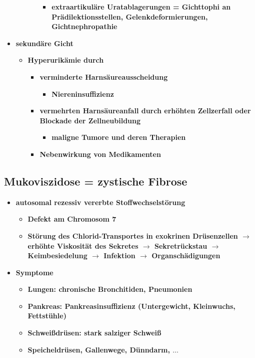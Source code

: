 \begin{itemize}
\begin{itemize}
\begin{itemize}
							\begin{itemize}
								\item \textbf{extraartikuläre Uratablagerungen = Gichttophi an Prädilektionsstellen, Gelenkdeformierungen, Gichtnephropathie}
							\end{itemize}
					\end{itemize}								
			\end{itemize}
		\item \textbf{sekundäre Gicht}
			\begin{itemize}
				\item \textbf{Hyperurikämie durch}
					\begin{itemize}
						\item \textbf{verminderte Harnsäureausscheidung}
							\begin{itemize}
								\item \textbf{Niereninsuffizienz}
							\end{itemize}
						\item \textbf{vermehrten Harnsäureanfall durch erhöhten Zellzerfall oder Blockade der Zellneubildung}
							\begin{itemize}
								\item \textbf{maligne Tumore und deren Therapien}
							\end{itemize}
						\item \textbf{Nebenwirkung von Medikamenten}
					\end{itemize}
			\end{itemize}
	\end{itemize}
\subsection{Mukoviszidose = zystische Fibrose}
	\begin{itemize}
		\item \textbf{autosomal rezessiv vererbte Stoffwechselstörung}
			\begin{itemize}
				\item \textbf{Defekt am Chromosom 7}
				\item \textbf{Störung des Chlorid-Transportes in exokrinen Drüsenzellen $\rightarrow$ erhöhte Viskosität des Sekretes $\rightarrow$ Sekretrückstau $\rightarrow$ Keimbesiedelung $\rightarrow$ Infektion $\rightarrow$ Organschädigungen}
			\end{itemize}
		\item \textbf{Symptome}
			\begin{itemize}
				\item \textbf{Lungen: chronische Bronchitiden, Pneumonien}
				\item \textbf{Pankreas: Pankreasinsuffizienz (Untergewicht, Kleinwuchs, Fettstühle)}
				\item \textbf{Schweißdrüsen: stark salziger Schweiß}
				\item \textbf{Speicheldrüsen, Gallenwege, Dünndarm, $\dots$}
			\end{itemize}
	\end{itemize}
